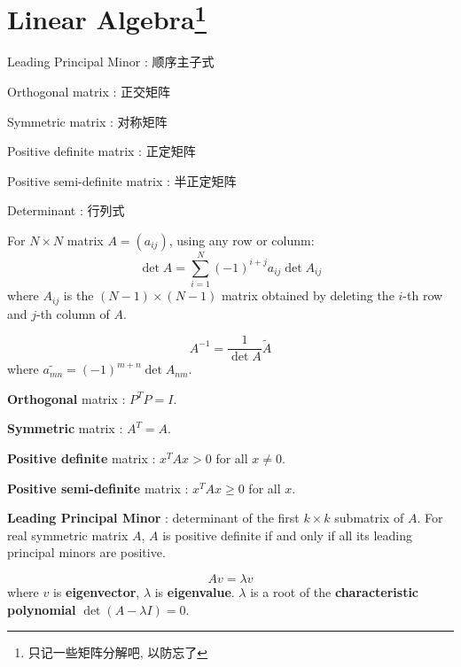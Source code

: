 \chapter{Linear Algebra\footnote{只记一些矩阵分解吧, 以防忘了}}
\begin{introduction}
    \item Leading Principal Minor : 顺序主子式
    \item Orthogonal matrix : 正交矩阵
    \item Symmetric matrix : 对称矩阵
    \item Positive definite matrix : 正定矩阵
    \item Positive semi-definite matrix : 半正定矩阵
    \item Determinant : 行列式
\end{introduction}
\begin{definition}
    For $N\times N$ matrix $A = (a_{ij})$, using any row or colunm:
    $$ \det A = \sum_{i=1}^{N} (-1)^{i+j} a_{ij} \det A_{ij} $$
    where $A_{ij}$ is the $(N-1)\times (N-1)$ matrix obtained by deleting the $i$-th row and $j$-th column of $A$.
\end{definition}
\begin{theorem}
    $$A^{-1} = \frac{1}{\det A} \tilde{A} $$
    where $\tilde{a_{mn}} = (-1)^{m+n} \det A_{nm}$.
\end{theorem}
\begin{definition}
    \textbf{Orthogonal} matrix : $P^T P = I$. 

    \textbf{Symmetric} matrix : $A^T = A$.
    
    \textbf{Positive definite} matrix : $x^T A x > 0$ for all $x \neq 0$.
    
    \textbf{Positive semi-definite} matrix : $x^T A x \geq 0$ for all $x$.
\end{definition}
\begin{definition}
    \textbf{Leading Principal Minor} : determinant of the first $k\times k$ submatrix of $A$.
    For real symmetric matrix $A$, $A$ is positive definite if and only if all its leading principal minors are positive.
\end{definition}


\begin{definition}
    $$Av = \lambda v$$
    where $v$ is \textbf{eigenvector}, $\lambda$ is \textbf{eigenvalue}.
    $\lambda$ is a root of the \textbf{characteristic polynomial} $\det(A - \lambda I) = 0$.
\end{definition}

